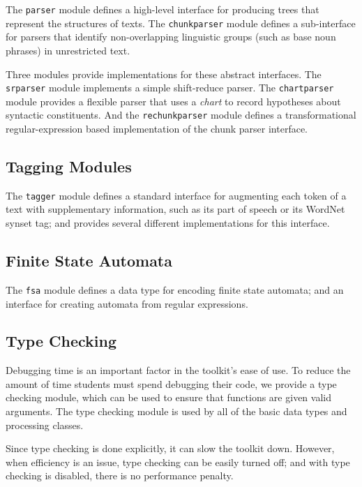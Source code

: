 \documentclass[11pt]{article}
\begin{document}
The \texttt{parser} module defines a high-level interface for
producing trees that represent the structures of texts.  The
\texttt{chunkparser} module defines a sub-interface for parsers that
identify non-overlapping linguistic groups (such as base noun phrases)
in unrestricted text.

Three modules provide implementations for these abstract interfaces.
The \texttt{srparser} module implements a simple shift-reduce parser.
The \texttt{chartparser} module provides a flexible parser that uses a
\emph{chart} to record hypotheses about syntactic constituents.  And
the \texttt{rechunkparser} module defines a transformational
regular-expression based implementation of the chunk parser interface.

\subsection*{Tagging Modules}

The \texttt{tagger} module defines a standard interface for augmenting
each token of a text with supplementary information, such as its part
of speech or its WordNet synset tag; and provides several different
implementations for this interface.

\subsection*{Finite State Automata}

The \texttt{fsa} module defines a data type for encoding finite state
automata; and an interface for creating automata from regular
expressions.

\subsection*{Type Checking}

Debugging time is an important factor in the toolkit's ease of use.
To reduce the amount of time students must spend debugging their code,
we provide a type checking module, which can be used to ensure that
functions are given valid arguments.  The type checking module is
used by all of the basic data types and processing classes.

Since type checking is done explicitly, it can slow the toolkit down.
However, when efficiency is an issue, type checking can be easily
turned off; and with type checking is disabled, there is no
performance penalty.
\end{document}

